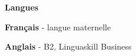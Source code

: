 \documentclass[10pt,a4paper]{article}
\newcommand{\smallsection}[2]{%
  \vspace{8pt}
  {\fontsize{8.9pt}{10.45pt}\selectfont\bfseries\color{accentdark}%
  {\scriptsize\color{accent}#1}\hspace{3.5pt}#2}\par
  \vspace{3.2pt}
}
\newlength{\maincolumnheight}
\begin{document}
\begin{minipage}[t]{0.285\textwidth}
{\begin{minipage}[t][\maincolumnheight][t]{0.91\linewidth}
  \smallsection{}{Langues}
  \textbf{Français} - langue maternelle\par
  \textbf{Anglais} - B2, Linguaskill Business
  \vspace{6pt}
  \end{minipage}
}

\end{minipage}
\hfill
\usebox{\maincolumnbox}
\end{document}

